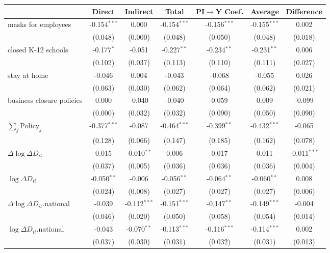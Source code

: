 
\begin{tabular}{lccccc|>{}c}
\toprule
  & Direct & Indirect & Total & PI$\to$Y Coef. & Average & Difference\\
\midrule
masks for employees & -0.154$^{***}$ & 0.000 & -0.154$^{***}$ & -0.156$^{***}$ & -0.155$^{***}$ & 0.002\\
 & (0.048) & (0.000) & (0.048) & (0.050) & (0.048) & (0.018)\\
closed K-12 schools & -0.177$^{*}$ & -0.051 & -0.227$^{**}$ & -0.234$^{**}$ & -0.231$^{**}$ & 0.006\\
 & (0.102) & (0.037) & (0.113) & (0.110) & (0.111) & (0.027)\\
stay at home & -0.046 & 0.004 & -0.043 & -0.068 & -0.055 & 0.026\\
 & (0.063) & (0.030) & (0.062) & (0.064) & (0.062) & (0.021)\\
business closure policies & 0.000 & -0.040 & -0.040 & 0.059 & 0.009 & -0.099\\
 & (0.000) & (0.032) & (0.032) & (0.090) & (0.050) & (0.090)\\
$\sum_j \mathrm{Policy}_j$ & -0.377$^{***}$ & -0.087 & -0.464$^{***}$ & -0.399$^{**}$ & -0.432$^{***}$ & -0.065\\
 & (0.128) & (0.066) & (0.147) & (0.185) & (0.162) & (0.078)\\
$\Delta \log \Delta D_{it}$ & 0.015 & -0.010$^{**}$ & 0.006 & 0.017 & 0.011 & -0.011$^{***}$\\
 & (0.037) & (0.005) & (0.036) & (0.036) & (0.036) & (0.004)\\
$\log \Delta D_{it}$ & -0.050$^{**}$ & -0.006 & -0.056$^{**}$ & -0.064$^{**}$ & -0.060$^{**}$ & 0.008\\
 & (0.024) & (0.008) & (0.027) & (0.027) & (0.027) & (0.006)\\
$\Delta \log \Delta D_{it}$.national & -0.039 & -0.112$^{***}$ & -0.151$^{***}$ & -0.147$^{**}$ & -0.149$^{***}$ & -0.004\\
 & (0.046) & (0.020) & (0.050) & (0.058) & (0.054) & (0.014)\\
$\log \Delta D_{it}$.national & -0.043 & -0.070$^{**}$ & -0.113$^{***}$ & -0.116$^{***}$ & -0.114$^{***}$ & 0.002\\
 & (0.037) & (0.030) & (0.031) & (0.032) & (0.031) & (0.013)\\
\bottomrule
\end{tabular}